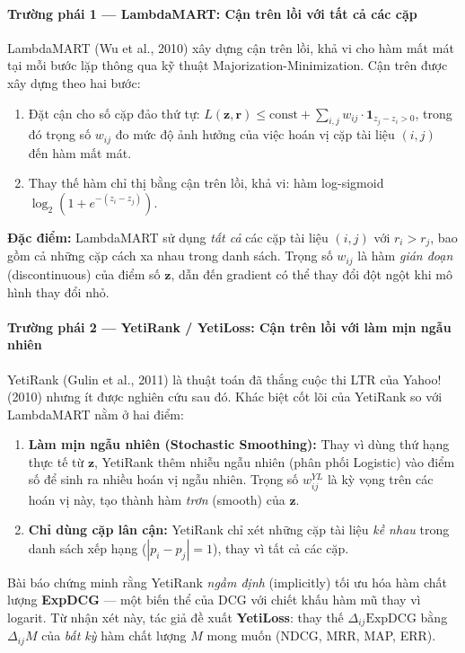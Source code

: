 \paragraph{Trường phái 1 --- LambdaMART: Cận trên lồi với tất cả các cặp}
LambdaMART (Wu et al., 2010) xây dựng cận trên lồi, khả vi cho hàm mất mát tại mỗi bước lặp thông qua kỹ thuật Majorization-Minimization. Cận trên được xây dựng theo hai bước:
\begin{enumerate}
  \item Đặt cận cho số cặp đảo thứ tự: $L(\mathbf{z}, \mathbf{r}) \leq \text{const} + \sum_{i,j} w_{ij} \cdot \mathbf{1}_{z_j - z_i > 0}$, trong đó trọng số $w_{ij}$ đo mức độ ảnh hưởng của việc hoán vị cặp tài liệu $(i, j)$ đến hàm mất mát.
  \item Thay thế hàm chỉ thị bằng cận trên lồi, khả vi: hàm log-sigmoid $\log_2(1 + e^{-(z_i - z_j)})$.
\end{enumerate}
\textbf{Đặc điểm:} LambdaMART sử dụng \emph{tất cả} các cặp tài liệu $(i, j)$ với $r_i > r_j$, bao gồm cả những cặp cách xa nhau trong danh sách. Trọng số $w_{ij}$ là hàm \emph{gián đoạn} (discontinuous) của điểm số $\mathbf{z}$, dẫn đến gradient có thể thay đổi đột ngột khi mô hình thay đổi nhỏ.

\paragraph{Trường phái 2 --- YetiRank / YetiLoss: Cận trên lồi với làm mịn ngẫu nhiên}
YetiRank (Gulin et al., 2011) là thuật toán đã thắng cuộc thi LTR của Yahoo! (2010) nhưng ít được nghiên cứu sau đó. Khác biệt cốt lõi của YetiRank so với LambdaMART nằm ở hai điểm:
\begin{enumerate}
  \item \textbf{Làm mịn ngẫu nhiên (Stochastic Smoothing):} Thay vì dùng thứ hạng thực tế từ $\mathbf{z}$, YetiRank thêm nhiễu ngẫu nhiên (phân phối Logistic) vào điểm số để sinh ra nhiều hoán vị ngẫu nhiên. Trọng số $w_{ij}^{YL}$ là kỳ vọng trên các hoán vị này, tạo thành hàm \emph{trơn} (smooth) của $\mathbf{z}$.
  \item \textbf{Chỉ dùng cặp lân cận:} YetiRank chỉ xét những cặp tài liệu \emph{kề nhau} trong danh sách xếp hạng ($|p_i - p_j| = 1$), thay vì tất cả các cặp.
\end{enumerate}

Bài báo chứng minh rằng YetiRank \emph{ngầm định} (implicitly) tối ưu hóa hàm chất lượng \textbf{ExpDCG} --- một biến thể của DCG với chiết khấu hàm mũ thay vì logarit. Từ nhận xét này, tác giả đề xuất \textbf{YetiLoss}: thay thế $\Delta_{ij}\text{ExpDCG}$ bằng $\Delta_{ij}M$ của \emph{bất kỳ} hàm chất lượng $M$ mong muốn (NDCG, MRR, MAP, ERR).

